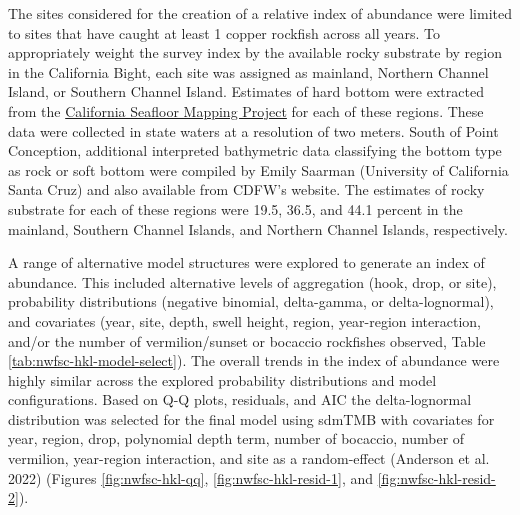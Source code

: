 \documentclass[11pt,
  english,
  letterpaper,
]{article}
\begin{document}
The sites considered for the creation of a relative index of abundance were limited to sites that have caught at least 1 copper rockfish across all years. To appropriately weight the survey index by the available rocky substrate by region in the California Bight, each site was assigned as mainland, Northern Channel Island, or Southern Channel Island. Estimates of hard bottom were extracted from the \href{http://seafloor.otterlabs.org/index.html}{California Seafloor Mapping Project} for each of these regions. These data were collected in state waters at a resolution of two meters. South of Point Conception, additional interpreted bathymetric data classifying the bottom type as rock or soft bottom were compiled by Emily Saarman (University of California Santa Cruz) and also available from CDFW's website. The estimates of rocky substrate for each of these regions were 19.5, 36.5, and 44.1 percent in the mainland, Southern Channel Islands, and Northern Channel Islands, respectively.

A range of alternative model structures were explored to generate an index of abundance. This included alternative levels of aggregation (hook, drop, or site), probability distributions (negative binomial, delta-gamma, or delta-lognormal), and covariates (year, site, depth, swell height, region, year-region interaction, and/or the number of vermilion/sunset or bocaccio rockfishes observed, Table \ref{tab:nwfsc-hkl-model-select}). The overall trends in the index of abundance were highly similar across the explored probability distributions and model configurations. Based on Q-Q plots, residuals, and AIC the delta-lognormal distribution was selected for the final model using sdmTMB with covariates for year, region, drop, polynomial depth term, number of bocaccio, number of vermilion, year-region interaction, and site as a random-effect (Anderson et al. 2022) (Figures \ref{fig:nwfsc-hkl-qq}, \ref{fig:nwfsc-hkl-resid-1}, and \ref{fig:nwfsc-hkl-resid-2}).

\begingroup\fontsize{9}{11}\selectfont
\end{document}
